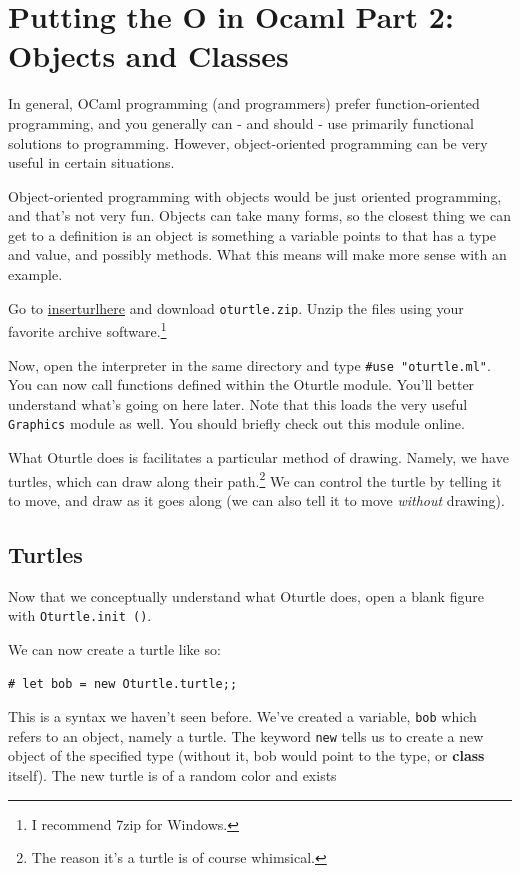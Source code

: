 \documentclass[10pt]{book}
\begin{document}
\chapter{Putting the O in Ocaml Part 2: Objects and Classes}

In general, OCaml programming (and programmers) prefer function-oriented programming, and you generally can - and should - use primarily functional solutions to programming. However, object-oriented programming can be very useful in certain situations.

Object-oriented programming with objects would be just oriented programming, and that's not very fun. Objects can take many forms, so the closest thing we can get to a definition is an object is something a variable points to that has a type and value, and possibly methods. What this means will make more sense with an example.

Go to \url{inserturlhere} and download {\tt oturtle.zip}. Unzip the files using your favorite archive software.\footnote{I recommend 7zip for Windows.}

Now, open the interpreter in the same directory and type {\tt \#use "oturtle.ml"}. You can now call functions defined within the Oturtle module. You'll better understand  what's going on here later. Note that this loads the very useful {\tt Graphics} module as well. You should briefly check out this module online.

What Oturtle does is facilitates a particular method of drawing. Namely, we have turtles, which can draw along their path.\footnote{The reason it's a turtle is of course whimsical.} We can control the turtle by telling it to move, and draw as it goes along (we can also tell it to move {\it without} drawing).

\section{Turtles}

Now that we conceptually understand what Oturtle does, open a blank figure with {\tt Oturtle.init ()}.

We can now create a turtle like so:

\beforeverb
\begin{verbatim}
# let bob = new Oturtle.turtle;;
\end{verbatim}
\afterverb

This is a syntax we haven't seen before. We've created a variable, {\tt bob} which refers to an object, namely a turtle. The keyword {\tt new} tells us to create a new object of the specified type (without it, bob would point to the type, or {\bf class} itself). The new turtle is of a random color and exists
\end{document}
